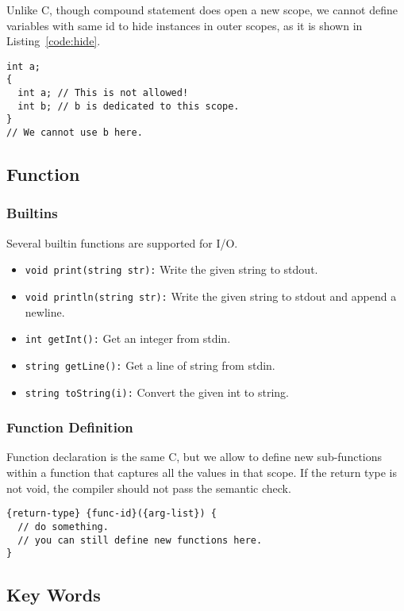 \documentclass{article}
\begin{document}
Unlike C, though compound statement does open a new scope,
we cannot define variables with same id to hide instances in outer scopes,
as it is shown in Listing~\ref{code:hide}.
\begin{lstlisting}[caption=An example of scope\label{code:hide}]
int a;
{
  int a; // This is not allowed!
  int b; // b is dedicated to this scope.
}
// We cannot use b here.
\end{lstlisting}

\subsection{Function}

\subsubsection{Builtins}

Several builtin functions are supported for I/O.
\begin{itemize}
  \item \texttt{void print(string str):} Write the given string to stdout.
  \item \texttt{void println(string str):} Write the given string to stdout and append a newline.
  \item \texttt{int getInt():} Get an integer from stdin.
  \item \texttt{string getLine():} Get a line of string from stdin.
  \item \texttt{string toString(i):} Convert the given int to string.
\end{itemize}

\subsubsection{Function Definition}

Function declaration is the same C, but we allow to define new sub-functions
within a function that captures all the values in that scope. If the return
type is not void, the compiler should not pass the semantic check.

\begin{lstlisting}[caption=Function Declaration]
{return-type} {func-id}({arg-list}) {
  // do something.
  // you can still define new functions here.
}
\end{lstlisting}

\subsection{Key Words}
\end{document}
